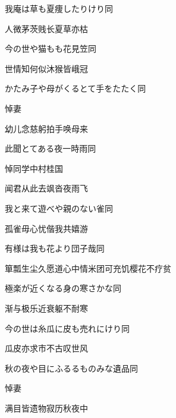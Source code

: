 \begin{haiku}
    {\FH 我庵は草も夏痩したりけり}\hfill{\FH 同}

    {\FK 人微茅茨贱长夏草亦枯}
\end{haiku}

\begin{haiku}
    {\FH 今の世や猫もも花見笠}\hfill{\FH 同}

    {\FK 世情知何似沐猴皆峨冠}
\end{haiku}

\begin{haiku}
    {\FH かたみ子や母がくるとて手をたたく}\hfill{\FH 同}

    {\FK 悼妻}

    {\FK 幼儿念慈躬拍手唤母来}
\end{haiku}

\begin{haiku}
    {\FH 此聞とてある夜一時雨}\hfill{\FH 同}

    {\FK 悼同学中村桂国}

    {\FK 闻君从此去飒沓夜雨飞}
\end{haiku}

\begin{haiku}
    {\FH 我と来て遊べや親のない雀}\hfill{\FH 同}

    {\FK 孤雀毋心忧偕我共嬉游}
\end{haiku}

\begin{haiku}
    {\FH 有様は我も花より団子哉}\hfill{\FH 同}

    {\FK 箪瓢生尘久愿道心中情米团可充饥樱花不疗贫}
\end{haiku}

\begin{haiku}
    {\FH 極楽が近くなる身の寒さかな}\hfill{\FH 同}

    {\FK 渐与极乐近衰躯不耐寒}
\end{haiku}

\begin{haiku}
    {\FH 今の世は糸瓜に皮も売れにけり}\hfill{\FH 同}

    {\FK 瓜皮亦求市不古叹世风}
\end{haiku}

\begin{haiku}
    {\FH 秋の夜や目にふるるものみな遺品}\hfill{\FH 同}

    {\FK 悼妻}

    {\FK 满目皆遗物寂历秋夜中}
\end{haiku}

